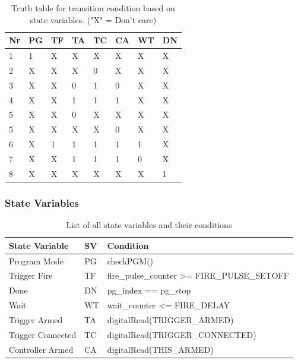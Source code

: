 \begin{table}[!ht]
\centering
\begin{tabular}{|l|l|l|l|l|l|l|l|} 
\hline
Nr & PG & TF & TA & TC & CA & WT & DN  \\ 
\hline \hline
1  & 1  & X  & X  & X  & X  & X  & X   \\ 
\hline
2  & X  & X  & X  & 0  & X  & X  & X   \\ 
\hline
3  & X  & X  & 0  & 1  & 0  & X  & X   \\ 
\hline
4  & X  & X  & 1  & 1  & 1  & X  & X   \\ 
\hline
5  & X  & X  & 0  & X  & X  & X  & X   \\ 
\hline
5  & X  & X  & X  & X  & 0  & X  & X   \\ 
\hline
6  & X  & 1  & 1  & 1  & 1  & 1  & X   \\ 
\hline
7  & X  & X  & 1  & 1  & 1  & 0  & X   \\ 
\hline
8  & X  & X  & X  & X  & X  & X  & 1   \\
\hline
\end{tabular}
\caption{Truth table for transition condition based on state variables. ("X" = Don't care)}
\label{lst:transcond}
\end{table}

\subsubsection{State Variables}

\begin{table}[!ht]
\centering
\begin{tabular}{|l|l|l|} 
\hline
State Variable    & SV & Condition                                   \\ 
\hline \hline
Program Mode      & PG & checkPGM()                                  \\ 
\hline
Trigger Fire      & TF & fire\_pulse\_counter >= FIRE\_PULSE\_SETOFF  \\ 
\hline
Done              & DN & pg\_index == pg\_stop                       \\ 
\hline
Wait              & WT & wait\_counter <= FIRE\_DELAY                 \\ 
\hline
Trigger Armed     & TA & digitalRead(TRIGGER\_ARMED)                 \\ 
\hline
Trigger Connected & TC & digitalRead(TRIGGER\_CONNECTED)             \\ 
\hline
Controller Armed  & CA & digitalRead(THIS\_ARMED)                    \\
\hline
\end{tabular}	
\caption{List of all state variables and their conditions}
\label{tab:state_vars_list}
\end{table}


